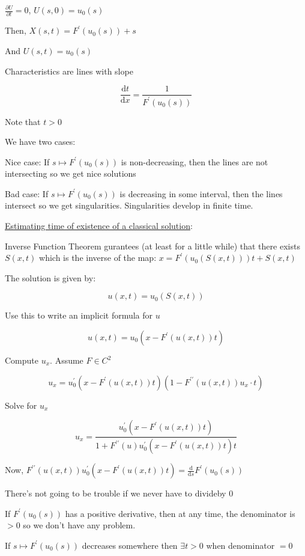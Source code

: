 \documentclass{article}
\theoremstyle{definition}
\begin{document}
\(\frac{\partial U}{\partial t} = 0\), \(U(s,0)=u_0(s)\) 

Then, \(X(s,t) = F^{\prime} (u_0(s))+s\)

And \(U(s,t)=u_0(s)\) 

Characteristics are lines with slope

\[
    \frac{\mathrm{d}t}{\mathrm{d}x} = \frac{1}{F^{\prime} (u_0(s))}
\]

Note that \(t > 0\) 

We have two cases:

Nice case: If \(s \mapsto F^{\prime} (u_0(s))\) is non-decreasing, then the lines are not intersecting so we get nice solutions

Bad case: If \(s \mapsto F^{\prime} (u_0(s))\) is decreasing in some interval, then the lines intersect so we get singularities. Singularities develop in finite time.

\underline{Estimating time of existence of a classical solution}:

Inverse Function Theorem gurantees (at least for a little while) that there exists \(S(x,t)\) which is the inverse of the map: \(x = F^{\prime} (u_0(S(x,t)))t + S(x,t)\)

The solution is given by:

\[
    u(x,t) = u_0(S(x,t))
\]

Use this to write an implicit formula for \(u\) 

\[
    u(x,t) = u_0(x - F^{\prime}(u(x,t))t)
\]

Compute \(u_x\). Assume \(F\in C^2\) 

\[
    u_x = u_0^{\prime} (x - F^{\prime}(u(x,t))t)(1-F^{\prime\prime} (u(x,t))u_x\cdot t)
\]

Solve for \(u_x\) 

\[
    u_x = \frac{u_0^{\prime}(x - F^{\prime} (u(x,t))t)}{1 + F^{\prime\prime} (u)u_0^{\prime} (x-F^{\prime} (u(x,t))t)t}
\]

Now, \(F^{\prime\prime} (u(x,t))u_0^{\prime} (x-F^{\prime} (u(x,t))t) = \frac{\mathrm{d}}{\mathrm{d}s} F^{\prime} (u_0(s))\) 

There's not going to be trouble if we never have to divideby \(0\) 

If \(F^{\prime} (u_0(s))\) has a positive derivative, then at any time, the denominator is \(>0\) so we don't have any problem.

If \(s \mapsto F^{\prime}(u_0(s))\) decreases somewhere then \(\exists t > 0\) when denominator \(=0\)
\end{document}

